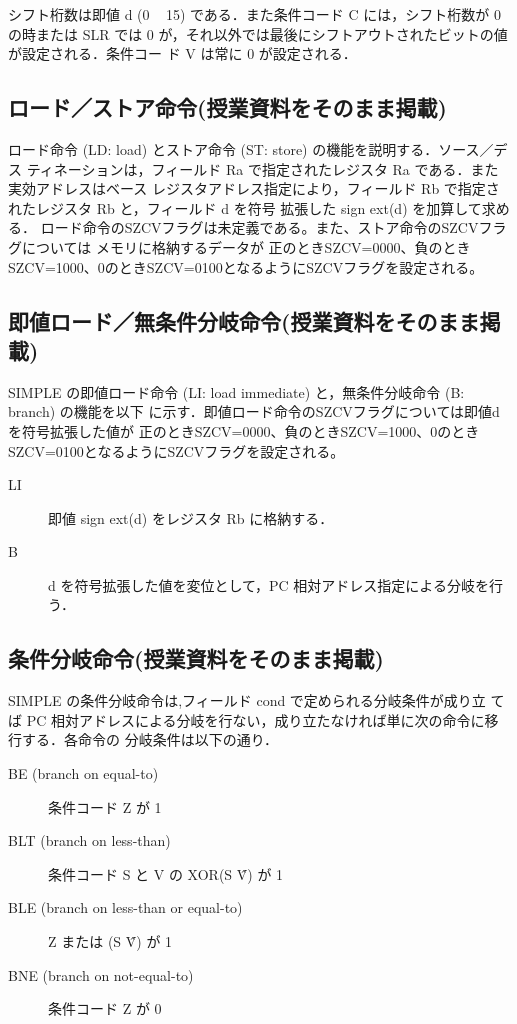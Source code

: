 \documentclass[a4j,titlepage]{jarticle}
\begin{document}
シフト桁数は即値 d (0 ~ 15) である．また条件コード C には，シフト桁数が 0 の時または
SLR では 0 が，それ以外では最後にシフトアウトされたビットの値が設定される．条件コー
ド V は常に 0 が設定される．

\subsection{ロード／ストア命令(授業資料をそのまま掲載)}
ロード命令 (LD: load) とストア命令 (ST: store) の機能を説明する．ソース／デス
ティネーションは，フィールド Ra で指定されたレジスタ Ra である．また実効アドレスはベース
レジスタアドレス指定により，フィールド Rb で指定されたレジスタ Rb と，フィールド d を符号
拡張した sign ext(d) を加算して求める．
ロード命令のSZCVフラグは未定義である。また、ストア命令のSZCVフラグについては
メモリに格納するデータが
正のときSZCV=0000、負のときSZCV=1000、0のときSZCV=0100となるようにSZCVフラグを設定される。



\subsection{即値ロード／無条件分岐命令(授業資料をそのまま掲載)}
SIMPLE の即値ロード命令 (LI: load immediate) と，無条件分岐命令 (B: branch) の機能を以下
に示す．即値ロード命令のSZCVフラグについては即値dを符号拡張した値が
正のときSZCV=0000、負のときSZCV=1000、0のときSZCV=0100となるようにSZCVフラグを設定される。
\begin{description}
\item [LI] 即値 sign ext(d) をレジスタ Rb に格納する．
\item [B] d を符号拡張した値を変位として，PC 相対アドレス指定による分岐を行う．
\end{description}

\subsection{条件分岐命令(授業資料をそのまま掲載)}
SIMPLE の条件分岐命令は,フィールド cond で定められる分岐条件が成り立
てば PC 相対アドレスによる分岐を行ない，成り立たなければ単に次の命令に移行する．各命令の
分岐条件は以下の通り．
\begin{description}
\item [BE (branch on equal-to)] 条件コード Z が 1
\item [BLT (branch on less-than)] 条件コード S と V の XOR(S \^ V) が 1
\item [BLE (branch on less-than or equal-to)] Z または (S \^ V) が 1
\item [BNE (branch on not-equal-to)] 条件コード Z が 0
\end{description}
\end{document}
